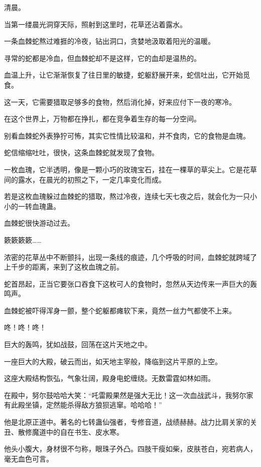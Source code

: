 
\begin{this_body}

清晨。

当第一缕晨光洞穿天际，照射到这里时，花草还沾着露水。

一条血棘蛇熬过难捱的冷夜，钻出洞口，贪婪地汲取着阳光的温暖。

寻常的蛇都是冷血，但血棘蛇却不是这样，它的血却是温热的。

血温上升，让它渐渐恢复了往日里的敏捷，蛇躯舒展开来，蛇信吐出，它开始觅食。

这一天，它需要猎取足够多的食物，然后消化掉，好来应付下一夜的寒冷。

在这个世界上，万物都在挣扎，都在竞争着生存的每一分空间。

别看血棘蛇外表狰狞可怖，其实它性情比较温和，并不食肉，它的食物是血瑰。

蛇信缩缩吐吐，很快，这条血棘蛇就发现了食物。

一枚血瑰，它半透明，像是一颗小巧的玫瑰宝石，挂在一棵草的草尖上。它是花草间的露水，在晨光的初照之下，一定几率变化而成。

若是这枚血瑰躲过血棘蛇的猎取，熬过冷夜，连续七天七夜之后，就会化为一只小小的一转血瑰蛊。

血棘蛇很快游动过去。

簌簌簌簌……

浓密的花草丛中不断颤抖，出现一条线的痕迹，几个呼吸的时间，血棘蛇就跨域了上千步的距离，来到了这枚血瑰之前。

蛇首昂起，正当它要张口吞食下这枚可人的食物时，忽然从天边传来一声巨大的轰鸣声。

血棘蛇被吓得浑身一颤，整个蛇躯都瘫软下来，竟然一丝力气都使不上来。

咚！咚！咚！

巨大的轰鸣，犹如战鼓，回荡在这片天地之中。

一座巨大的大殿，破云而出，如天地主宰般，降临到这片平原的上空。

这座大殿结构恢弘，气象壮阔，殿身电蛇缠绕。无数雷霆如林如雨。

在殿中，努尔鼓哈哈大笑：“吒雷殿果然是强大无比！这一次血战武斗，我努尔家有此殿坐镇，定然能杀得敌方狼狈逃窜。哈哈哈！”

他是北原正道中。著名的七转蛊仙强者，专修音道，战绩赫赫。战力比肩关家的关丑、散修魔道中的自在书生、皮水寒。

他头小腹大，身材很不匀称，眼珠子外凸。四肢干瘦如柴，皮肤苍白，宛若病人，毫无血色可言。


\end{this_body}
